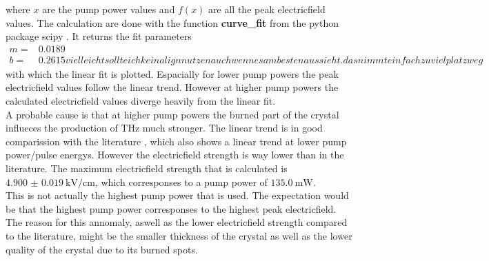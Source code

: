 where $x$ are the pump power values and $f(x)$ are all the peak electricfield values.
The calculation are done with the function \textbf{curve\_fit} from the python package scipy \cite{scipy}.
It returns the fit parameters 
\begin{align*}
    m =& 0.0189\\
    b =& 0.2615
    vielleicht sollte ich kein align nutzen auch wenn es am besten aussieht. das nimmt einfach zu viel platz weg
\end{align*}
with which the linear fit is plotted.
Espacially for lower pump powers the peak electricfield values follow the linear trend.
However at higher pump powers the calculated electricfield values diverge heavily from the linear fit.
\\
A probable cause is that at higher pump powers the burned part of the crystal influeces the production of $\si{\tera\hertz}$ much stronger.
The linear trend is in good comparission with the literature \cite{electric_field_compare}, which also shows a linear trend at lower pump power/pulse energys.
However the electricfield strength is way lower than in the literature.
The maximum electricfield strength that is calculated is $\SI{4.900(19)}{\kilo\V\per\centi\meter}$, which corresponses to a pump power of $\SI{135.0}{\milli\W}$.
\\
This is not actually the highest pump power that is used.
The expectation would be that the highest pump power corresponses to the highest peak electricfield.
The reason for this annomaly, aswell as the lower electricfield strength compared to the literature, might be the smaller thickness of the crystal as well as the lower quality of the crystal due to its burned spots.

